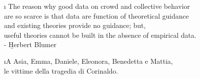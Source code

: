 \begin{flushright}
\large{
    \i{
        The reason why good data on crowd and collective behavior\\are so scarce is that data are function of theoretical guidance\\and existing theories provide no guidance; but,\\useful theories cannot be built in the absence of empirical data.}\\
        - \b{Herbert Blumer}
    }
    
    \vfill
        \i{A Asia, Emma, Daniele, Eleonora, Benedetta e Mattia,\\le vittime della tragedia di Corinaldo.
    \vfill
}
\end{flushright}